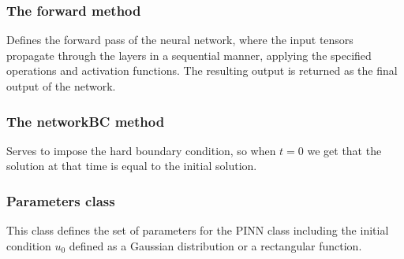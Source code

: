 \documentclass{article}
\begin{document}
\subsubsection*{The forward method} Defines the forward pass of the neural network, where the input tensors propagate through the layers in a sequential manner, applying the specified operations and activation functions. The resulting output is returned as the final output of the network.

\subsubsection*{The networkBC method} Serves to impose the hard boundary condition, so when $t=0$ we get that the solution at that time is equal to the initial solution. 

\subsubsection{Parameters class} This class defines the set of parameters for the PINN class including the initial condition $u_0$ defined as a Gaussian distribution or a rectangular function.
\end{document}
